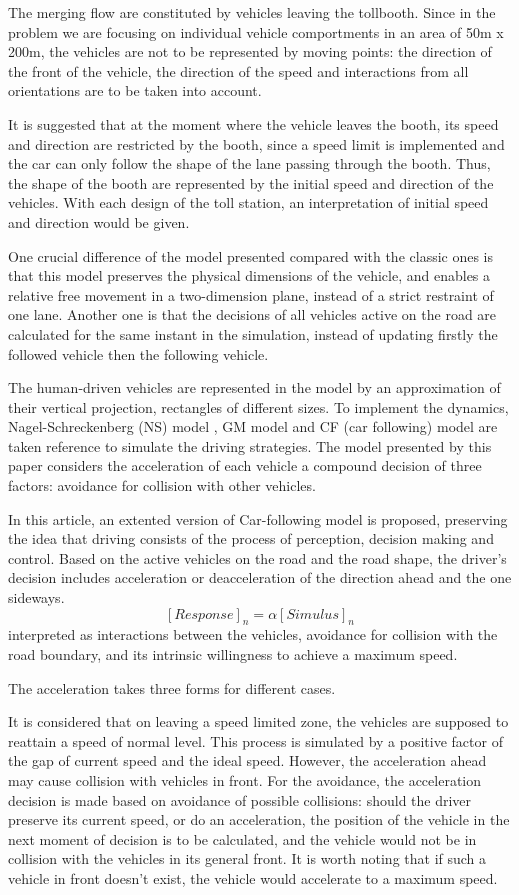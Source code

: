 \documentclass{mcmthesis}
\begin{document}
The merging flow are constituted by vehicles leaving the tollbooth. Since in the problem we are focusing on individual vehicle comportments in an area of 50m x 200m, the vehicles are not to be represented by moving points: the direction of the front of the vehicle, the direction of the speed and interactions from all orientations are to be taken into account.

It is suggested that at the moment where the vehicle leaves the booth, its speed and direction are restricted by the booth, since a speed limit is implemented and the car can only follow the shape of the lane passing through the booth. Thus, the shape of the booth are represented by the initial speed and direction of the vehicles. With each design of the toll station, an interpretation of initial speed and direction would be given.

One crucial difference of the model presented compared with the classic ones is that this model preserves the physical dimensions of the vehicle, and enables a relative free movement in a two-dimension plane, instead of a strict restraint of one lane. Another one is that the decisions of all vehicles active on the road are calculated for the same instant in the simulation, instead of updating firstly the followed vehicle then the following vehicle.

The human-driven vehicles are represented in the model by an approximation of their vertical projection, rectangles of different sizes. To implement the dynamics, Nagel-Schreckenberg (NS) model \cite{acelluar}, GM model and CF (car following) model are taken reference to simulate the driving strategies. The model presented by this paper considers the acceleration of each vehicle a compound decision of three factors: avoidance for collision with other vehicles.


In this article, an extented version of Car-following model is proposed, preserving the idea that driving consists of the process of perception, decision making and control. Based on the active vehicles on the road and the road shape, the driver's decision includes acceleration or deacceleration of the direction ahead and the one sideways.
$$[Response]_n= \alpha [Simulus]_n$$
 interpreted as interactions between the vehicles, avoidance for collision with the road boundary, and its intrinsic willingness to achieve a maximum speed. 

The acceleration takes three forms for different cases.

It is considered that on leaving a speed limited zone, the vehicles are supposed to reattain a speed of normal level. This process is simulated by a positive factor of the gap of current speed and the ideal speed. However, the acceleration ahead may cause collision with vehicles in front. For the avoidance, the acceleration decision is made based on avoidance of possible collisions: should the driver preserve its current speed, or do an acceleration, the position of the vehicle in the next moment of decision is to be calculated, and the vehicle would not be in collision with the vehicles in its general front. It is worth noting that if such a vehicle in front doesn't exist, the vehicle would accelerate to a maximum speed.
\end{document}
